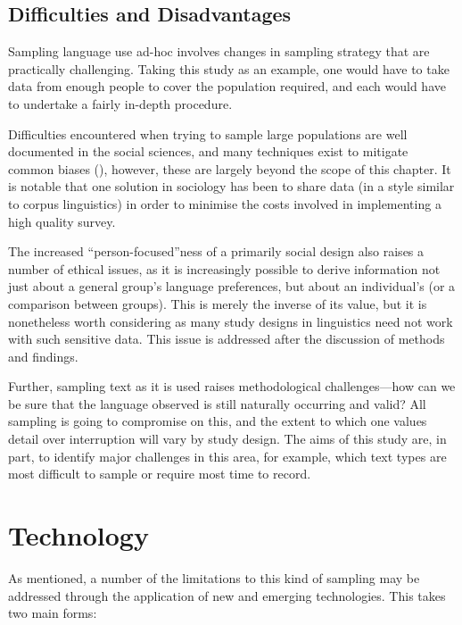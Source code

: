 \subsection{Difficulties and Disadvantages}
Sampling language use ad-hoc involves changes in sampling strategy that are practically challenging.  Taking this study as an example, one would have to take data from enough people to cover the population required, and each would have to undertake a fairly in-depth procedure.

Difficulties encountered when trying to sample large populations are well documented in the social sciences, and many techniques exist to mitigate common biases (), however, these are largely beyond the scope of this chapter.  It is notable that one solution in sociology has been to share data (in a style similar to corpus linguistics) in order to minimise the costs involved in implementing a high quality survey.

The increased ``person-focused''ness of a primarily social design also raises a number of ethical issues, as it is increasingly possible to derive information not just about a general group's language preferences, but about an individual's (or a comparison between groups).  This is merely the inverse of its value, but it is nonetheless worth considering as many study designs in linguistics need not work with such sensitive data.  This issue is addressed after the discussion of methods and findings.

Further, sampling text as it is used raises methodological challenges---how can we be sure that the language observed is still naturally occurring and valid?  All sampling is going to compromise on this, and the extent to which one values detail over interruption will vary by study design.  The aims of this study are, in part, to identify major challenges in this area, for example, which text types are most difficult to sample or require most time to record.














\section{Technology}
As mentioned, a number of the limitations to this kind of sampling may be addressed through the application of new and emerging technologies.  This takes two main forms:


